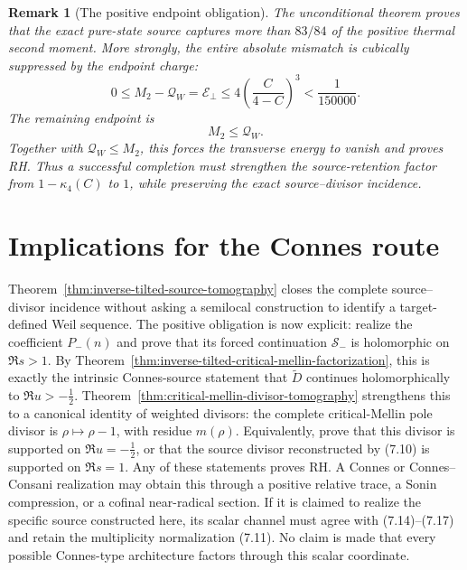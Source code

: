 \documentclass[11pt]{article}
\newtheorem{remark}[theorem]{Remark}
\newcommand{\cS}{\mathcal S}
\begin{document}
\begin{remark}[The positive endpoint obligation]
\label{rem:thermal-boundary}
The unconditional theorem proves that the exact pure-state source captures more than $83/84$ of
the positive thermal second moment.  More strongly, the entire absolute mismatch is cubically
suppressed by the endpoint charge:
\[
 0\le M_2-\mathcal Q_W=\mathcal E_\perp
 \le4\left(\frac{C}{4-C}\right)^3<\frac1{150000}.
\]
The
remaining endpoint is
\[
 \boxed{M_2\le\mathcal Q_W.}
 \tag{9.29}
\]
Together with $\mathcal Q_W\le M_2$, this forces the transverse energy to vanish and proves RH.
Thus a successful completion must strengthen the source-retention factor from
$1-\kappa_4(C)$ to $1$, while preserving the exact source--divisor incidence.
\end{remark}

\section{Implications for the Connes route}

Theorem~\ref{thm:inverse-tilted-source-tomography} closes the complete source--divisor incidence
without asking a semilocal construction to identify a target-defined Weil sequence.  The positive
obligation is now explicit: realize the coefficient $P_-(n)$ and prove that its forced continuation
$\cS_-$ is holomorphic on $\Re s>1$.  By
Theorem~\ref{thm:inverse-tilted-critical-mellin-factorization}, this is exactly the intrinsic
Connes-source statement that $\widetilde D$ continues holomorphically to $\Re u>-\frac12$.
Theorem~\ref{thm:critical-mellin-divisor-tomography} strengthens this to a canonical identity of
weighted divisors: the complete critical-Mellin pole divisor is $\rho\mapsto\rho-1$, with residue
$m(\rho)$.  Equivalently, prove that this divisor is supported on $\Re u=-\frac12$, or that the
source divisor reconstructed by \textup{(7.10)} is supported on $\Re s=1$.  Any of these
statements proves RH.  A Connes or
Connes--Consani realization may obtain this through a positive relative trace, a Sonin
compression, or a cofinal near-radical section.  If it is claimed to realize the specific source
constructed here, its scalar channel must agree with \textup{(7.14)}--\textup{(7.17)} and retain
the multiplicity normalization \textup{(7.11)}.  No claim is made that every possible
Connes-type architecture factors through this scalar coordinate.
\end{document}
